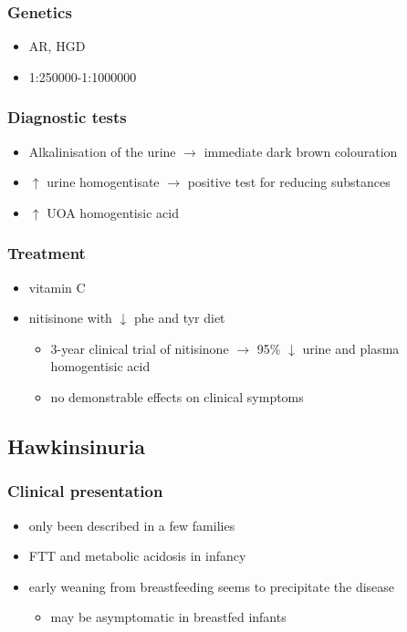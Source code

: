 \documentclass{scrartcl}
\begin{document}
\subsubsection{Genetics}
\label{sec:orgb9bdadd}
\begin{itemize}
\item AR, HGD
\item 1:250000-1:1000000
\end{itemize}
\subsubsection{Diagnostic tests}
\label{sec:org3520d04}
\begin{itemize}
\item Alkalinisation of the urine \(\to\) immediate dark brown colouration
\item \(\uparrow\) urine homogentisate \(\to\) positive test for reducing substances
\item \(\uparrow\) UOA homogentisic acid
\end{itemize}
\subsubsection{Treatment}
\label{sec:org2e8eee4}
\begin{itemize}
\item vitamin C
\item nitisinone with \(\downarrow\) phe and tyr diet
\begin{itemize}
\item 3-year clinical trial of nitisinone \(\to\) 95\% \(\downarrow\) urine and plasma homogentisic acid
\item no demonstrable effects on clinical symptoms
\end{itemize}
\end{itemize}

\subsection{Hawkinsinuria}
\label{sec:org056b405}
\subsubsection{Clinical presentation}
\label{sec:orgc517526}
\begin{itemize}
\item only been described in a few families
\item FTT and metabolic acidosis in infancy
\item early weaning from breastfeeding seems to precipitate the disease
\begin{itemize}
\item may be asymptomatic in breastfed infants
\end{itemize}
\end{itemize}
\end{document}
